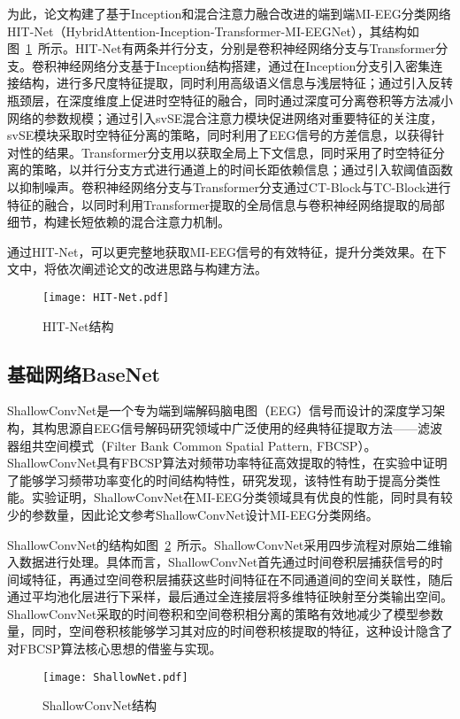 为此，论文构建了基于Inception和混合注意力融合改进的端到端MI-EEG分类网络HIT-Net（HybridAttention-Inception-Transformer-MI-EEGNet），其结构如图~\ref{fig:HIT}~所示。HIT-Net有两条并行分支，分别是卷积神经网络分支与Transformer分支。卷积神经网络分支基于Inception结构搭建，通过在Inception分支引入密集连接结构，进行多尺度特征提取，同时利用高级语义信息与浅层特征；通过引入反转瓶颈层，在深度维度上促进时空特征的融合，同时通过深度可分离卷积等方法减小网络的参数规模；通过引入svSE混合注意力模块促进网络对重要特征的关注度，svSE模块采取时空特征分离的策略，同时利用了EEG信号的方差信息，以获得针对性的结果。Transformer分支用以获取全局上下文信息，同时采用了时空特征分离的策略，以并行分支方式进行通道上的时间长距依赖信息；通过引入软阈值函数以抑制噪声。卷积神经网络分支与Transformer分支通过CT-Block与TC-Block进行特征的融合，以同时利用Transformer提取的全局信息与卷积神经网络提取的局部细节，构建长短依赖的混合注意力机制。

通过HIT-Net，可以更完整地获取MI-EEG信号的有效特征，提升分类效果。在下文中，将依次阐述论文的改进思路与构建方法。

\begin{figure}
    \centering
    \texttt{[image: HIT-Net.pdf]}
    \caption{HIT-Net结构}
    \label{fig:HIT}
\end{figure}

\subsection{基础网络BaseNet}

ShallowConvNet\cite{schirrmeister2017deep}是一个专为端到端解码脑电图（EEG）信号而设计的深度学习架构，其构思源自EEG信号解码研究领域中广泛使用的经典特征提取方法——滤波器组共空间模式（Filter Bank Common Spatial Pattern, FBCSP）\cite{ang2008filter}。ShallowConvNet具有FBCSP算法对频带功率特征高效提取的特性，在实验中证明了能够学习频带功率变化的时间结构特性\cite{schirrmeister2017deep}，研究发现，该特性有助于提高分类性能\cite{sakhavi2015parallel}。实验证明，ShallowConvNet在MI-EEG分类领域具有优良的性能\cite{lawhern2018eegnet}，同时具有较少的参数量，因此论文参考ShallowConvNet设计MI-EEG分类网络。

ShallowConvNet的结构如图~\ref{fig:ShallowConvNet}~所示。ShallowConvNet采用四步流程对原始二维输入数据进行处理。具体而言，ShallowConvNet首先通过时间卷积层捕获信号的时间域特征，再通过空间卷积层捕获这些时间特征在不同通道间的空间关联性，随后通过平均池化层进行下采样，最后通过全连接层将多维特征映射至分类输出空间。ShallowConvNet采取的时间卷积和空间卷积相分离的策略有效地减少了模型参数量，同时，空间卷积核能够学习其对应的时间卷积核提取的特征，这种设计隐含了对FBCSP算法核心思想的借鉴与实现。
\begin{figure}
    \centering
    \texttt{[image: ShallowNet.pdf]}
    \caption{ShallowConvNet结构}
    \label{fig:ShallowConvNet}
\end{figure}


